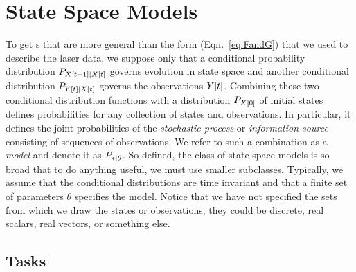 \section{State Space Models}
\label{sec:formal_ssm}

To get s that are more general than the form
(Eqn.~\eqref{eq:FandG}) that we used to describe the laser data, we
suppose only that a conditional probability distribution
$P_{{X}{[t+1]}\mid {X}{[t]}}$ governs evolution in state space and
another conditional distribution $P_{{Y}{[t]}\mid {X}{[t]}}$ governs the
observations ${Y}{[t]}$.  Combining these two conditional
distribution functions with a distribution $P_{{X}{[0]}}$ of initial
states defines probabilities for any collection of states and
observations.  In particular, it defines the joint probabilities of
the \emph{stochastic process} or \emph{information source} consisting
of sequences of observations.  We refer to such a combination as a
\emph{model} and denote it as $P_{*\mid \theta}$.  So defined, the class
of state space models is so broad that to do anything useful, we must
use smaller subclasses.  Typically, we assume that the conditional
distributions are time invariant and that a finite set of parameters
$\theta$ specifies the model.  Notice that we have not specified the
sets from which we draw the states or observations; they could be
discrete, real scalars, real vectors, or something else.


\subsection{Tasks}
\label{sec:tasks}

